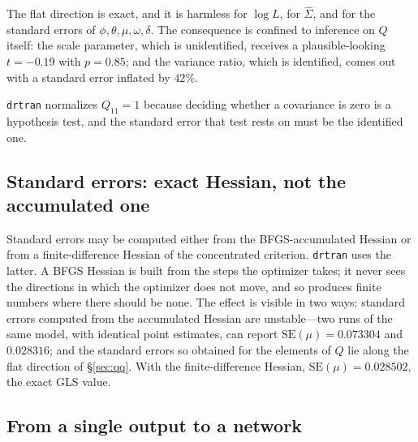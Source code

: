 \documentclass[11pt,a4paper]{article}
\theoremstyle{plain}
\theoremstyle{remark}
\begin{document}
The flat direction is exact, and it is harmless for $\log L$, for $\hat\Sigma$,
and for the standard errors of $\phi,\theta,\mu,\omega,\delta$. The consequence is
confined to inference on $Q$ itself: the scale parameter, which is unidentified,
receives a plausible-looking $t=-0.19$ with $p=0.85$; and the variance ratio,
which is identified, comes out with a standard error inflated by $42\%$.

\texttt{drtran} normalizes $Q_{11}=1$ because deciding whether a covariance is
zero is a hypothesis test, and the standard error that test rests on must be the
identified one.

\subsection{Standard errors: exact Hessian, not the accumulated one}
\label{sec:hessian}

Standard errors may be computed either from the BFGS-accumulated Hessian or from a
finite-difference Hessian of the concentrated criterion. \texttt{drtran} uses the
latter. A BFGS Hessian is built from the steps the optimizer takes; it never sees
the directions in which the optimizer does not move, and so produces finite numbers
where there should be none. The effect is visible in two ways: standard errors
computed from the accumulated Hessian are unstable---two runs of the same model,
with identical point estimates, can report $\mathrm{SE}(\mu)=0.073304$ and
$0.028316$; and the standard errors so obtained for the elements of $Q$ lie along
the flat direction of \S\ref{sec:qq}. With the finite-difference Hessian,
$\mathrm{SE}(\mu)=0.028502$, the exact GLS value.

\subsection{From a single output to a network}
\label{sec:network}
\end{document}
